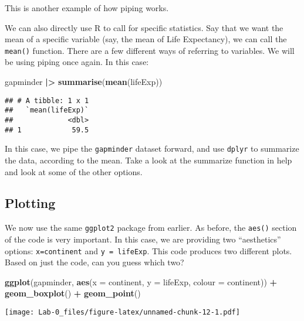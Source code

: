 \documentclass[
]{article}
\newenvironment{Shaded}{\begin{snugshade}}{\end{snugshade}}
\newcommand{\AttributeTok}[1]{\textcolor[rgb]{0.13,0.29,0.53}{#1}}
\newcommand{\FunctionTok}[1]{\textcolor[rgb]{0.13,0.29,0.53}{\textbf{#1}}}
\newcommand{\NormalTok}[1]{#1}
\newcommand{\SpecialCharTok}[1]{\textcolor[rgb]{0.81,0.36,0.00}{\textbf{#1}}}
\begin{document}
This is another example of how piping works.

We can also directly use R to call for specific statistics. Say that we
want the mean of a specific variable (say, the mean of Life Expectancy),
we can call the \texttt{mean()} function. There are a few different ways
of referring to variables. We will be using piping once again. In this
case:

\begin{Shaded}
\begin{Highlighting}[]
\NormalTok{gapminder }\SpecialCharTok{|\textgreater{}} 
  \FunctionTok{summarise}\NormalTok{(}\FunctionTok{mean}\NormalTok{(lifeExp))}
\end{Highlighting}
\end{Shaded}

\begin{verbatim}
## # A tibble: 1 x 1
##   `mean(lifeExp)`
##             <dbl>
## 1            59.5
\end{verbatim}

In this case, we pipe the \texttt{gapminder} dataset forward, and use
\texttt{dplyr} to summarize the data, according to the mean. Take a look
at the summarize function in help and look at some of the other options.

\subsection{Plotting}\label{plotting}

We now use the same \texttt{ggplot2} package from earlier. As before,
the \texttt{aes()} section of the code is very important. In this case,
we are providing two ``aesthetics'' options: \texttt{x=continent} and
\texttt{y\ =\ lifeExp}. This code produces two different plots. Based on
just the code, can you guess which two?

\begin{Shaded}
\begin{Highlighting}[]
\FunctionTok{ggplot}\NormalTok{(gapminder, }\FunctionTok{aes}\NormalTok{(}\AttributeTok{x =}\NormalTok{ continent, }\AttributeTok{y =}\NormalTok{ lifeExp, }\AttributeTok{colour =}\NormalTok{ continent)) }\SpecialCharTok{+}
  \FunctionTok{geom\_boxplot}\NormalTok{() }\SpecialCharTok{+}
  \FunctionTok{geom\_point}\NormalTok{()}
\end{Highlighting}
\end{Shaded}

\texttt{[image: Lab-0\_files/figure-latex/unnamed-chunk-12-1.pdf]}
\end{document}
